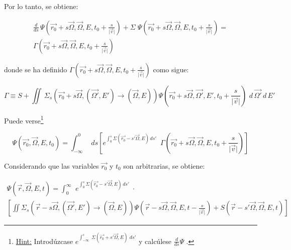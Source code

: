 Por lo tanto, se obtiene:

\begin{eqnarray}
	\frac{d}{d s} \, \Psi \left( \vec{r_{0}} + s \vec{\Omega}, \vec{\Omega}, E, t_{0} +\frac{s}{\lvert\vec{v}\rvert}  \right) + 
	\Sigma \; \Psi \left( \vec{r_{0}} + s \vec{\Omega}, \vec{\Omega}, E, t_{0} +\frac{s}{\lvert\vec{v}\rvert} \right)
	= \\
	\Gamma \left( \vec{r_{0}} + s \vec{\Omega}, \vec{\Omega}, E, t_{0} +\frac{s}{\lvert\vec{v}\rvert} \right)
 \label{EqXII}
\end{eqnarray}

donde se ha definido $\Gamma \left( \vec{r_{0}} + s \vec{\Omega}, \vec{\Omega}, E, t_{0} +\frac{s}{\lvert\vec{v}\rvert} \right)$ como sigue:

\begin{equation}
 \Gamma \equiv S + \iint \, \Sigma _{s} \left( \vec{r_{0}} + s \vec{\Omega}, (\vec{\Omega'}, E') \rightarrow (\vec{\Omega}, E)  \right)
	\Psi \left( \vec{r_{0}} + s \vec{\Omega}, \vec{\Omega'}, E', t_{0} +\frac{s}{\lvert\vec{v}\rvert}  \right) \, \, d \, \vec{\Omega'} \, d \, E'
 \label{EqXIII} 
\end{equation}

Puede verse\footnote{\underline{Hint:} Introd\'uzcase $e^{ \int _{-\infty} ^{s} \, \, \Sigma \left( \vec{r_{0}} + s' \vec{\Omega}, E \right) \, \, ds'}$
y calc\'ulese $\frac{d}{d s} \Psi $ .}

\begin{equation}
 	\Psi \left( \vec{r_{0}}, \vec{\Omega}, E, t_{0} \right) = \int  _{-\infty} ^{0} \, \: ds \left[ e^{ \int _{0} ^{s} 
 	\Sigma \left( \vec{r_{0}} - s' \vec{\Omega}, E \right) \, ds' }  \; \: 
 	\Gamma \left( \vec{r_{0}} + s \vec{\Omega}, \vec{\Omega}, E, t_{0} +\frac{s}{\lvert\vec{v}\rvert} \right) \right]
 \label{EqXIV} 
\end{equation}


Considerando que las variables $\vec{r_{0}}$ y $t_{0}$ son arbitrarias, se obtiene:

\begin{eqnarray}
 	\Psi \left( \vec{r}, \vec{\Omega}, E, t \right) =   %
 	 \int  _{0} ^{\infty} \, \: e^{ \int _{0} ^{s} \Sigma \left( \vec{r_{0}} - s' \vec{\Omega}, E \right) \, ds' }  \; \cdotp \; \: \nonumber \\
 	\left[ \iint \Sigma_{s} \left( \vec{r} - s \vec{\Omega}, (\vec{\Omega'}, E') \rightarrow (\vec{\Omega}, E)  \right)
 	\Psi \left( \vec{r} - s \vec{\Omega}, \vec{\Omega}, E, t - \frac{s}{\lvert\vec{v}\rvert} \right) %
 	+  S \left( \vec{r} - s' \vec{\Omega}, \vec{\Omega}, E, t  \right)  \right]
 \label{EqXV} 
\end{eqnarray}

